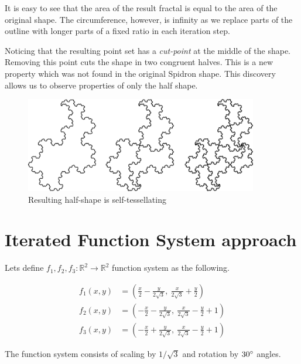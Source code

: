 \documentclass[11pt]{article}
\begin{document}
\noindent It is easy to see that the area of the result fractal is equal to the area of the original shape. The circumference, however, is infinity as we replace parts of the outline with longer parts of a fixed ratio in each iteration step.

\noindent Noticing that the resulting point set has a \emph{cut-point} at the middle of the shape. Removing this point cuts the shape in two congruent halves. This is a new property which was not found in the original Spidron shape. This discovery allows us to observe properties of only the half shape.

\begin{figure}[h!tbp]
	\begin{center}
	\includegraphics[width=4in]{figures/division-3-steps}
	\end{center}
	\caption{Resulting half-shape is self-tessellating}
	\label{FigSample}
\end{figure}


\section*{Iterated Function System approach}

Lets define $f_{1} ,f_{2} ,f_{3} :\mathbb{R}^2\rightarrow \mathbb{R}^2$ function system as the following.

$$
\begin{aligned}
f_{1}(x,y) &= \left(  \frac{x}{2} - \frac{y}{2\sqrt{3}} ,\ \frac{x}{2\sqrt{3}} + \frac{y}{2} \right) \\
f_{2}(x,y) &= \left( -\frac{x}{2} - \frac{y}{2\sqrt{3}} ,\ \frac{x}{2\sqrt{3}} - \frac{y}{2} + 1 \right) \\
f_{3}(x,y) &= \left( -\frac{x}{2} + \frac{y}{2\sqrt{3}} ,\ \frac{x}{2\sqrt{3}} - \frac{y}{2} + 1 \right)
\end{aligned}
$$

\noindent The function system consists of scaling by $ 1 / \sqrt{3} $ and rotation by $30\degree$ angles.


\end{document}
